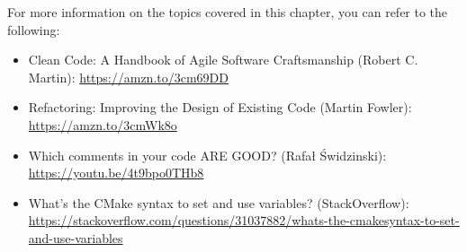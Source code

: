 
For more information on the topics covered in this chapter, you can refer to the following:


\begin{itemize}
\item 
Clean Code: A Handbook of Agile Software Craftsmanship (Robert C. Martin): \url{https://amzn.to/3cm69DD}

\item 
Refactoring: Improving the Design of Existing Code (Martin Fowler): \url{https://amzn.to/3cmWk8o}

\item 
Which comments in your code ARE GOOD? (Rafał Świdzinski): \url{https://youtu.be/4t9bpo0THb8}

\item 
What's the CMake syntax to set and use variables? (StackOverflow): \url{https://stackoverflow.com/questions/31037882/whats-the-cmakesyntax-to-set-and-use-variables}
\end{itemize}